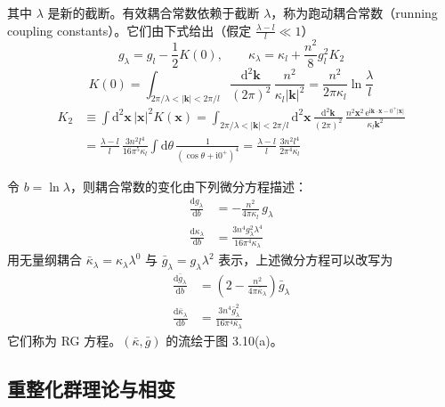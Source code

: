 其中 $\lambda$ 是新的截断。有效耦合常数依赖于截断 $\lambda$，称为跑动耦合常数（running coupling constants）。它们由下式给出（假定 $\frac{\lambda-l}{l}\ll 1$）
\begin{equation*}
g_\lambda = g_l - \frac{1}{2}K(0),\qquad \kappa_\lambda = \kappa_l + \frac{n^2}{8}g_l^2 K_2
\end{equation*}
\begin{equation*}
K(0) = \int_{2\pi/\lambda < |\pmb{k}| < 2\pi/l} \frac{\mathrm{d}^2\pmb{k}}{(2\pi)^2}\,\frac{n^2}{\kappa_l|\pmb{k}|^2} = \frac{n^2}{2\pi\kappa_l}\ln\frac{\lambda}{l}
\end{equation*}
\begin{align*}
K_2 &\equiv \int \mathrm{d}^2\pmb{x}\,|\pmb{x}|^2 K(\pmb{x}) = \int_{2\pi/\lambda < |\pmb{k}| < 2\pi/l} \mathrm{d}^2\pmb{x}\,\frac{\mathrm{d}^2\pmb{k}}{(2\pi)^2}\,\frac{n^2\pmb{x}^2\,\mathrm{e}^{\mathrm{i}\pmb{k}\cdot\pmb{x} - 0^+|\pmb{x}|}}{\kappa_l\pmb{k}^2} \\
&= \frac{\lambda-l}{l}\,\frac{3n^2l^4}{16\pi^5\kappa_l}\int \mathrm{d}\theta\,\frac{1}{(\cos\theta + \mathrm{i}0^+)^4} = \frac{\lambda-l}{l}\,\frac{3n^2l^4}{2\pi^4\kappa_l}
\end{align*}


令 $b = \ln\lambda$，则耦合常数的变化由下列微分方程描述：
\begin{align*}
\frac{\mathrm{d}g_\lambda}{\mathrm{d}b} &= -\frac{n^2}{4\pi\kappa_l}\,g_\lambda \\
\frac{\mathrm{d}\kappa_\lambda}{\mathrm{d}b} &= \frac{3n^4 g_\lambda^2\lambda^4}{16\pi^4\kappa_\lambda}
\end{align*}
用无量纲耦合 $\bar{\kappa}_\lambda = \kappa_\lambda\lambda^0$ 与 $\bar{g}_\lambda = g_\lambda\lambda^2$ 表示，上述微分方程可以改写为
\begin{align*}
\frac{\mathrm{d}\bar{g}_\lambda}{\mathrm{d}b} &= \left(2 - \frac{n^2}{4\pi\bar{\kappa}_\lambda}\right)\bar{g}_\lambda \\
\frac{\mathrm{d}\bar{\kappa}_\lambda}{\mathrm{d}b} &= \frac{3n^4\bar{g}_\lambda^2}{16\pi^4\bar{\kappa}_\lambda}\tag{3.5.9}
\end{align*}
它们称为 RG 方程。$(\bar{\kappa},\bar{g})$ 的流绘于图 3.10(a)。

\subsection{重整化群理论与相变}

